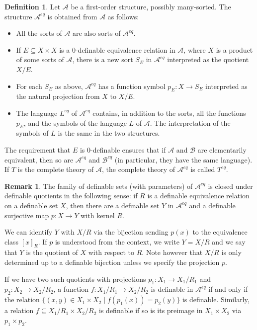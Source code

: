 \documentclass{amsart}
\newcommand{\ca}{\mathcal}
\theoremstyle{plain}
\theoremstyle{definition}
\newtheorem{rem}[thm]{Remark}
\newtheorem{defn}[thm]{Definition}
\begin{document}
\begin{defn}\label{defn:eq}
Let $\ca A$ be a first-order structure, possibly many-sorted. The structure $\ca A^{eq}$ is obtained from $\ca A$ as follows: 
\begin{itemize}
\item All the sorts of $\ca A$ are also sorts of $\ca A^{eq}$. 
\item If $E \subseteq X\times X$ is a $0$-definable equivalence relation in $\ca A$, where $X$ is a product of some sorts of $\ca A$, there is a new sort $S_E$ in $\ca A^{eq}$ interpreted as the quotient $X/E$. 
\item For each $S_E$ as above, $\ca A^{eq}$ has a function symbol $p_E:X\to S_E$ interpreted as the natural projection from $X$  to $X/E$. 
\item The language $L^{eq}$ of $\ca A^{eq}$ contains, in addition to the sorts, all the functions $p_E$, and the symbols of the language $L$ of $\ca A$. The interpretation of the symbols of $L$ is the same in the two structures. 
\end{itemize} 
\end{defn}
The requirement that $E$ is $0$-definable ensures that 
if $\ca A$ and $\ca B$ are elementarily equivalent, then so are $\ca A^{eq}$ and $\ca B^{eq}$ (in particular, they have the same language). If $T$ is the complete theory of $\ca A$, the complete theory of $\ca A^{eq}$ is called $T^{eq}$. 

\begin{rem}
The family of definable sets (with parameters) of $\ca A^{eq}$ is closed under definable quotients in the following sense: if $R$ is a definable equivalence relation on a definable set $X$, then there are a definable set $Y$ in $\ca A^{eq}$ and a definable surjective map $p:X\to Y$ with kernel $R$.  

We can identify $Y$ with $X/R$ via the bijection sending $p(x)$ to the equivalence class $[x]_R$. If $p$ is understood from the context, we write $Y= X/R$ and we say that $Y$ is the quotient of $X$ with respect to $R$. Note however that $X/R$ is only determined up to a definable bijection unless we specify the projection $p$. 

If we have two such quotients with projections $p_1:X_1\to X_1/R_1$ and $p_2: X_2 \to X_2/R_2$, a function $f:X_1/R_1\to X_2/R_2$ is definable in $\ca A^{eq}$ if and only if the relation $\{(x,y) \in X_1\times X_2  \mid f(p_1(x)) = p_2(y)\}$ is definable. Similarly, a relation $f \subseteq X_1/R_1 \times X_2/R_2$ is definable if so is its preimage in $X_1\times X_2$ via $p_1\times p_2$.  
\end{rem}
\end{document}
